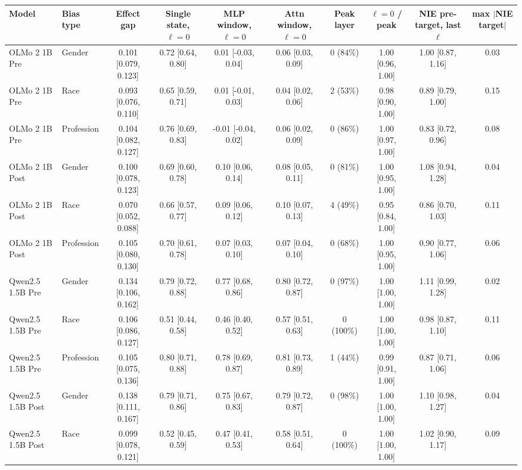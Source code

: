 \begin{tabular}{llcccccccc}
\toprule
Model & Bias type & Effect gap & Single state, $\ell=0$ & MLP window, $\ell=0$ & Attn window, $\ell=0$ & Peak layer & $\ell=0$ / peak & NIE pre-target, last $\ell$ & max $|$NIE target$|$ \\
\midrule
OLMo 2 1B Pre & Gender & 0.101 [0.079, 0.123] & 0.72 [0.64, 0.80] & 0.01 [-0.03, 0.04] & 0.06 [0.03, 0.09] & 0 (84\%) & 1.00 [0.96, 1.00] & 1.00 [0.87, 1.16] & 0.03 \\
OLMo 2 1B Pre & Race & 0.093 [0.076, 0.110] & 0.65 [0.59, 0.71] & 0.01 [-0.01, 0.03] & 0.04 [0.02, 0.06] & 2 (53\%) & 0.98 [0.90, 1.00] & 0.89 [0.79, 1.00] & 0.15 \\
OLMo 2 1B Pre & Profession & 0.104 [0.082, 0.127] & 0.76 [0.69, 0.83] & -0.01 [-0.04, 0.02] & 0.06 [0.02, 0.09] & 0 (86\%) & 1.00 [0.97, 1.00] & 0.83 [0.72, 0.96] & 0.08 \\
OLMo 2 1B Post & Gender & 0.100 [0.078, 0.123] & 0.69 [0.60, 0.78] & 0.10 [0.06, 0.14] & 0.08 [0.05, 0.11] & 0 (81\%) & 1.00 [0.95, 1.00] & 1.08 [0.94, 1.28] & 0.04 \\
OLMo 2 1B Post & Race & 0.070 [0.052, 0.088] & 0.66 [0.57, 0.77] & 0.09 [0.06, 0.12] & 0.10 [0.07, 0.13] & 4 (49\%) & 0.95 [0.84, 1.00] & 0.86 [0.70, 1.03] & 0.11 \\
OLMo 2 1B Post & Profession & 0.105 [0.080, 0.130] & 0.70 [0.61, 0.78] & 0.07 [0.03, 0.10] & 0.07 [0.04, 0.10] & 0 (68\%) & 1.00 [0.95, 1.00] & 0.90 [0.77, 1.06] & 0.06 \\
Qwen2.5 1.5B Pre & Gender & 0.134 [0.106, 0.162] & 0.79 [0.72, 0.88] & 0.77 [0.68, 0.86] & 0.80 [0.72, 0.87] & 0 (97\%) & 1.00 [1.00, 1.00] & 1.11 [0.99, 1.28] & 0.02 \\
Qwen2.5 1.5B Pre & Race & 0.106 [0.086, 0.127] & 0.51 [0.44, 0.58] & 0.46 [0.40, 0.52] & 0.57 [0.51, 0.63] & 0 (100\%) & 1.00 [1.00, 1.00] & 0.98 [0.87, 1.10] & 0.11 \\
Qwen2.5 1.5B Pre & Profession & 0.105 [0.075, 0.136] & 0.80 [0.71, 0.88] & 0.78 [0.69, 0.87] & 0.81 [0.73, 0.89] & 1 (44\%) & 0.99 [0.91, 1.00] & 0.87 [0.71, 1.06] & 0.06 \\
Qwen2.5 1.5B Post & Gender & 0.138 [0.111, 0.167] & 0.79 [0.71, 0.86] & 0.75 [0.67, 0.83] & 0.79 [0.72, 0.87] & 0 (98\%) & 1.00 [1.00, 1.00] & 1.10 [0.98, 1.27] & 0.04 \\
Qwen2.5 1.5B Post & Race & 0.099 [0.078, 0.121] & 0.52 [0.45, 0.59] & 0.47 [0.41, 0.53] & 0.58 [0.51, 0.64] & 0 (100\%) & 1.00 [1.00, 1.00] & 1.02 [0.90, 1.17] & 0.09 \\

\end{tabular}
